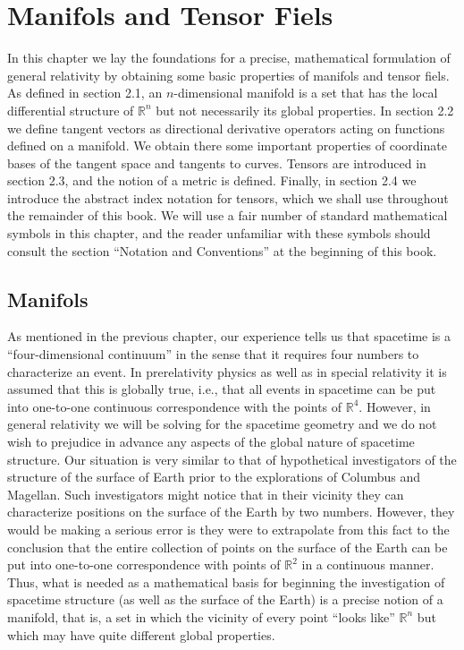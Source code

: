 \chapter{Manifols and Tensor Fiels}
In this chapter we lay the foundations for a precise, mathematical formulation of general relativity by obtaining some basic properties of manifols and tensor fiels. As defined in section 2.1, an $n$-dimensional manifold is a set that has the local differential structure of $\mathbb{R}^n$ but not necessarily its global properties. In section 2.2 we define tangent vectors as directional derivative operators acting on functions defined on a manifold. We obtain there some important properties of coordinate bases of the tangent space and tangents to curves. Tensors are introduced in section 2.3, and the notion of a metric is defined. Finally, in section 2.4 we introduce the abstract index notation for tensors, which we shall use throughout the remainder of this book. We will use a fair number of standard mathematical symbols in this chapter, and the reader unfamiliar with these symbols should consult the section ``Notation and Conventions'' at the beginning of this book.

\section{Manifols}
As mentioned in the previous chapter, our experience tells us that spacetime is a ``four-dimensional continuum'' in the sense that it requires four numbers to characterize an event. In prerelativity physics as well as in special relativity it is assumed that this is globally true, i.e., that all events in spacetime can be put into one-to-one continuous correspondence with the points of $\mathbb{R}^4$. However, in general relativity we will be solving for the spacetime geometry and we do not wish to prejudice in advance any aspects of the global nature of spacetime structure. Our situation is very similar to that of hypothetical investigators of the structure of the surface of Earth prior to the explorations of Columbus and Magellan. Such investigators might notice that in their vicinity they can characterize positions on the surface of the Earth by two numbers. However, they would be making a serious error is they were to extrapolate from this fact to the conclusion that the entire collection of points on the surface of the Earth can be put into one-to-one correspondence with points of $\mathbb{R}^2$ in a continuous manner. Thus, what is needed as a mathematical basis for beginning the investigation of spacetime structure (as well as the surface of the Earth) is a precise notion of a manifold, that is, a set in which the vicinity of every point ``looks like'' $\mathbb{R}^n$ but which may have quite different global properties.

